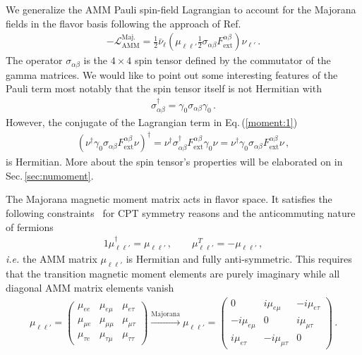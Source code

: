 \documentclass{ws-ijmpa}
\newcommand{\req}[1]{Eq.\,(\ref{#1})}
\newcommand{\rsec}[1]{Sec.\,{\ref{#1}}}
\begin{document}
We generalize the AMM Pauli spin-field Lagrangian to account for the Majorana fields in the flavor basis following the approach of Ref.~
\begin{align}
\label{moment:1}
-\mathcal{L}_{\mathrm{AMM}}^\mathrm{Maj.}=\frac{1}{2}\bar\nu_{\ell}\left(\mu_{\ell\ell'}\frac{1}{2}\sigma_{\alpha\beta}F^{\alpha\beta}_\mathrm{ext}\right)\nu_{\ell'}\,.
\end{align}
The operator $\sigma_{\alpha\beta}$ is the $4\times 4$ spin tensor defined by the commutator of the gamma matrices. We would like to point out some interesting features of the Pauli term most notably that the spin tensor itself is not Hermitian with
\begin{align}
\label{notherm:1}
\sigma_{\alpha\beta}^{\dag} = \gamma_{0}\sigma_{\alpha\beta}\gamma_{0}\,.
\end{align}
However, the conjugate of the Lagrangian term in \req{moment:1}
\begin{align}
\left(\nu^{\dag}\gamma_{0}\sigma_{\alpha\beta}F^{\alpha\beta}_\mathrm{ext}\nu\right)^{\dag} = \nu^{\dag}\sigma_{\alpha\beta}^{\dag}F^{\alpha\beta}_\mathrm{ext}\gamma_{0}\nu = \nu^{\dag}\gamma_{0}\sigma_{\alpha\beta}F^{\alpha\beta}_\mathrm{ext}\nu\,,
\end{align}
is Hermitian. More about the spin tensor's properties will be elaborated on in \rsec{sec:numoment}.

The Majorana magnetic moment matrix acts in flavor space. It satisfies the following constraints~\cite{Giunti:2014ixa} for CPT symmetry reasons and the anticommuting nature of fermions
\begin{alignat}{1}
\label{props:1}
\mu_{\ell\ell'}^{\dag}=\mu_{\ell\ell'}\,,\qquad
\mu_{\ell\ell'}^{T}=-\mu_{\ell\ell'}\,,
\end{alignat}
{\it i.e.\/} the AMM matrix $\mu_{\ell\ell'}$ is Hermitian and fully anti-symmetric. This requires that the transition magnetic moment elements are purely imaginary while all diagonal AMM matrix elements vanish
\begin{align}
\label{mu:1}
\mu_{\ell\ell'}=
\begin{pmatrix}
\mu_{ee} & \mu_{e\mu} & \mu_{e\tau} \\
\mu_{\mu e} & \mu_{\mu\mu} & \mu_{\mu\tau} \\
\mu_{\tau e} & \mu_{\tau\mu} & \mu_{\tau\tau}
\end{pmatrix}\xrightarrow{\mathrm{Majorana}}
\mu_{\ell\ell'}=
\begin{pmatrix}
0 & i\mu_{e\mu} & -i\mu_{e\tau} \\
-i\mu_{e\mu} & 0 & i\mu_{\mu\tau} \\
i\mu_{e\tau} & -i\mu_{\mu\tau} & 0
\end{pmatrix}\,.
\end{align}
\end{document}
